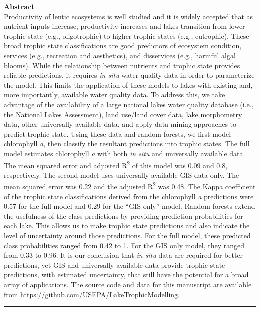 \documentclass[12pt,]{article}
\begin{document}
\textbf{Abstract}\\Productivity of lentic ecosystems is well studied and
it is widely accepted that as nutrient inputs increase, productivity
increases and lakes transition from lower trophic state (e.g.,
oligotrophic) to higher trophic states (e.g., eutrophic). These broad
trophic state classifications are good predictors of ecosystem
condition, services (e.g., recreation and aesthetics), and disservices
(e.g., harmful algal blooms). While the relationship between nutrients
and trophic state provides reliable predictions, it requires \emph{in
situ} water quality data in order to parameterize the model. This limits
the application of these models to lakes with existing and, more
importantly, available water quality data. To address this, we take
advantage of the availability of a large national lakes water quality
database (i.e., the National Lakes Assessment), land use/land cover
data, lake morphometry data, other universally available data, and apply
data mining approaches to predict trophic state. Using these data and
random forests, we first model chlorophyll \emph{a}, then classify the
resultant predictions into trophic states. The full model estimates
chlorophyll \emph{a} with both \emph{in situ} and universally available
data. The mean squared error and adjusted R\textsuperscript{2} of this
model was 0.09 and 0.8, respectively. The second model uses universally
available GIS data only. The mean squared error was 0.22 and the
adjusted R\textsuperscript{2} was 0.48. The Kappa coefficient of the
trophic state classifications derived from the chlorophyll \emph{a}
predictions were 0.57 for the full model and 0.29 for the ``GIS only''
model. Random forests extend the usefulness of the class predictions by
providing prediction probabilities for each lake. This allows us to make
trophic state predictions and also indicate the level of uncertainty
around those predictions. For the full model, these predicted class
probabilities ranged from 0.42 to 1. For the GIS only model, they ranged
from 0.33 to 0.96. It is our conclusion that \emph{in situ} data are
required for better predictions, yet GIS and universally available data
provide trophic state predictions, with estimated uncertainty, that
still have the potential for a broad array of applications. The source
code and data for this manuscript are available from
\url{https://github.com/USEPA/LakeTrophicModelling}.

\vspace{3mm}

\hrule
\end{document}
